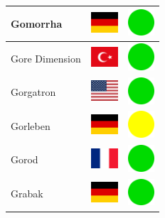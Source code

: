\documentclass[12pt, a4paper, twoside]{report}
\begin{document}
\begin{center}
\begin{longtable}{|p{5cm}|p{2cm}|p{2cm}|}
 Gomorrha                                                   & \includegraphics[width=1cm]{../4x3/de} &   \includegraphics[width=1cm]{../likes/y} \\ \hline
 Gore Dimension                                             & \includegraphics[width=1cm]{../4x3/tr} &   \includegraphics[width=1cm]{../likes/y} \\ \hline
 Gorgatron                                                  & \includegraphics[width=1cm]{../4x3/us} &   \includegraphics[width=1cm]{../likes/y} \\ \hline
 Gorleben                                                   & \includegraphics[width=1cm]{../4x3/de} &   \includegraphics[width=1cm]{../likes/m} \\ \hline
 Gorod                                                      & \includegraphics[width=1cm]{../4x3/fr} &   \includegraphics[width=1cm]{../likes/y} \\ \hline
 Grabak                                                     & \includegraphics[width=1cm]{../4x3/de} &   \includegraphics[width=1cm]{../likes/y} \\ \hline

\end{longtable}
\end{center}
\end{document}
